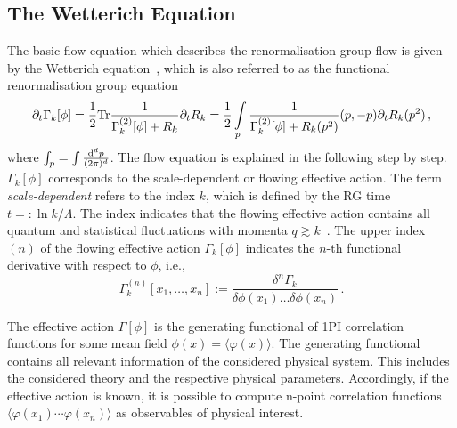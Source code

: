 \documentclass[paper=a4,11pt,bibliography=totoc]{scrartcl}
\begin{document}
\subsection{The Wetterich Equation}
\label{sec:wett}

The basic flow equation which describes the renormalisation group flow is given by the Wetterich equation~\cite{Wetterich1993}, which is also referred to as the functional renormalisation group equation
%
\begin{equation}
\label{eq:wetterich}
\partial_t \Gamma_k[\phi]=\frac12\textnormal{Tr}\frac{1}{\Gamma_k^{(2)}[\phi]+R_k} \partial_t R_k=\frac12 \int\displaylimits_p\frac{1}{\Gamma_k^{(2)}[\phi]+R_k(p^2)}(p, -p)\partial_t R_k(p^2)\,,
\end{equation}
%
where $\int\displaylimits_p = \int \frac{\textnormal{d}^dp}{(2\pi)^d}$. The flow equation is explained in the following step by step. $\Gamma_k[\phi]$ corresponds to the scale-dependent or flowing effective action. The term \textit{scale-dependent} refers to the index $k$, which is defined by the RG time $t=:\ln k/\Lambda$. The index indicates that the flowing effective action contains all quantum and statistical fluctuations with momenta $q \gtrsim k$~\cite{WikiFrg}. The upper index $(n)$ of the flowing effective action $\Gamma_k[\phi]$ indicates the $n$-th functional derivative with respect to $\phi$, i.e.,
%
\begin{equation}
\Gamma_k^{(n)}[x_1,\ldots,x_n] := \frac{\delta^n \Gamma_k}{\delta\phi(x_1)\ldots\delta\phi(x_n)}\,.
\end{equation}

The effective action $\Gamma[\phi]$ is the generating functional of 1PI correlation functions for some mean field $\phi(x) = \langle\varphi(x)\rangle$. The generating functional contains all relevant information of the considered physical system. This includes the considered theory and the respective physical parameters. Accordingly, if the effective action is known, it is possible to compute n-point correlation functions $\langle \varphi(x_1)\cdots \varphi(x_n)\rangle$ as observables of physical interest.
\end{document}
